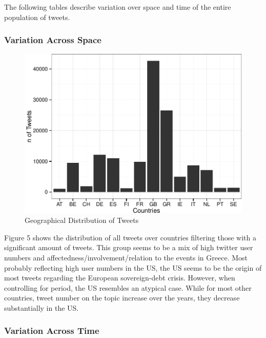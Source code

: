 \documentclass[]{article}
\begin{document}
The following tables describe variation over space and time of the
entire population of tweets.

\subsubsection{Variation Across Space}\label{variation-across-space}

\begin{figure}

{\centering \includegraphics{fin_paper_files/figure-latex/unnamed-chunk-3-1} 

}

\caption{Geographical Distribution of Tweets}\label{fig:unnamed-chunk-3}
\end{figure}

Figure 5 shows the distribution of all tweets over countries filtering
those with a significant amount of tweets. This group seems to be a mix
of high twitter user numbers and affectedness/involvement/relation to
the events in Greece. Most probably reflecting high user numbers in the
US, the US seems to be the origin of most tweets regarding the European
sovereign-debt crisis. However, when controlling for period, the US
resembles an atypical case. While for most other countries, tweet number
on the topic increase over the years, they decrease substantially in the
US.

\subsubsection{Variation Across Time}\label{variation-across-time}
\end{document}

